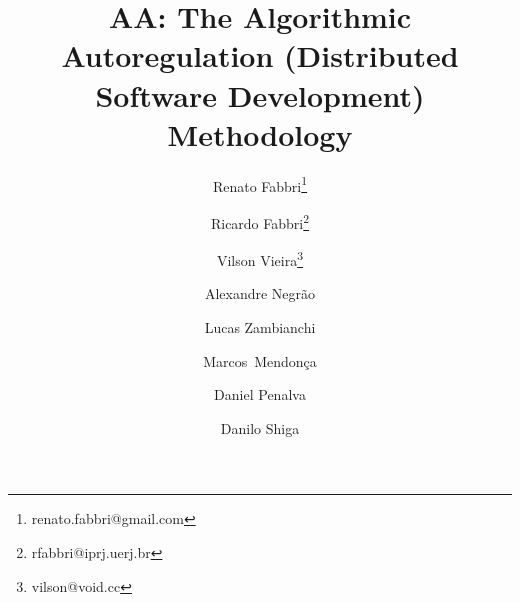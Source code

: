 \title{
    AA: The Algorithmic Autoregulation (Distributed Software Development) Methodology
}


\author[1,3]{Renato Fabbri\thanks{renato.fabbri@gmail.com}}
\author[2,3]{Ricardo Fabbri\thanks{rfabbri@iprj.uerj.br}}
\author[1,3]{Vilson Vieira\thanks{vilson@void.cc}}
\author[3]{Alexandre Negr\~{a}o}
\author[3]{Lucas Zambianchi}
\author[3]{Marcos~Mendon\c{c}a}
\author[1,3]{Daniel Penalva}
\author[3]{Danilo Shiga}

\renewcommand\Authands{ and }


\maketitle

